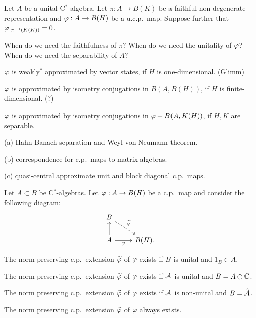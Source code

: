 \documentclass{../../large}
\begin{document}
\begin{prb}
Let $A$ be a unital C$^*$-algebra.
Let $\pi:A\to B(K)$ be a faithful non-degenerate representation and $\varphi:A\to B(H)$ be a u.c.p.~map.
Suppose further that $\varphi|_{\pi^{-1}(K(K))}=0$.

When do we need the faithfulness of $\pi$?
When do we need the unitality of $\varphi$?
When do we need the separability of $A$?
\begin{parts}
\item $\varphi$ is weakly$^*$ approximated by vector states, if $H$ is one-dimensional. (Glimm)
\item $\varphi$ is approximated by isometry conjugations in $B(A,B(H))$, if $H$ is finite-dimensional. (?)
\item $\varphi$ is approximated by isometry conjugations in $\varphi+B(A,K(H))$, if $H,K$ are separable.
\end{parts}
\end{prb}
\begin{pf}
(a)
Hahn-Banach separation and Weyl-von Neumann theorem.

(b)
correspondence for c.p.~maps to matrix algebras.

(c)
quasi-central approximate unit and block diagonal c.p.~maps.

\end{pf}


\begin{prb}
Let $A\subset B$ be C$^*$-algebras.
Let $\varphi:A\to B(H)$ be a c.p.~map and consider the following diagram:
\[\begin{tikzcd}
B\ar[dashed]{dr}{\tilde\f}&\\
A\ar{u}\ar[swap]{r}{\f}&B(H).
\end{tikzcd}\]
\begin{parts}
\item The norm preserving c.p.~extension $\widetilde{\varphi}$ of $\varphi$ exists if $B$ is unital and $1_B\in A$.
\item The norm preserving c.p.~extension $\widetilde{\varphi}$ of $\varphi$ exists if $\mathcal{A}$ is unital and $B=A\oplus\mathbb{C}$.
\item The norm preserving c.p.~extension $\widetilde{\varphi}$ of $\varphi$ exists if $\mathcal{A}$ is non-unital and $B=\widetilde{\mathcal{A}}$.
\item The norm preserving c.p.~extension $\widetilde{\varphi}$ of $\varphi$ always exists.
\end{parts}
\end{prb}
\end{document}
